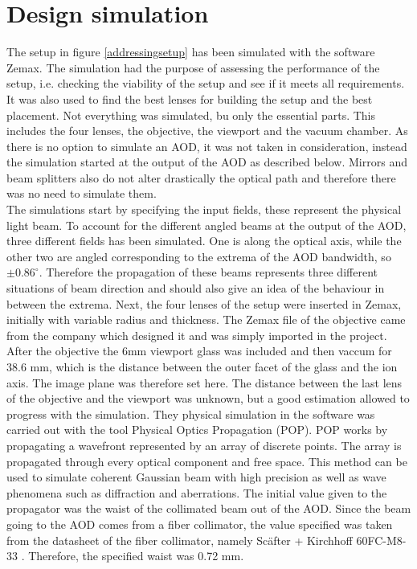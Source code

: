 \section{Design simulation}
The setup in figure \ref{addressingsetup} has been simulated with the software Zemax. The simulation had the purpose of assessing the performance of the setup, i.e. checking the viability of the setup and see if it meets all requirements. It was also used to find the best lenses for building the setup and the best placement. Not everything was simulated, bu only the essential parts. This includes the four lenses, the objective, the viewport and the vacuum chamber. As there is no option to simulate an AOD, it was not taken in consideration, instead the simulation started at the output of the AOD as described below. Mirrors and beam splitters also do not alter drastically the optical path and therefore there was no need to simulate them.\\
The simulations start by specifying the input fields, these represent the physical light beam. To account for the different angled beams at the output of the AOD, three different fields has been simulated. One is along the optical axis, while the other two are angled corresponding to the extrema of the AOD bandwidth, so $\pm0.86^{\circ}$. Therefore the propagation of these beams represents three different situations of beam direction and should also give an idea of the behaviour in between the extrema. Next, the four lenses of the setup were inserted in Zemax, initially with variable radius and thickness. The Zemax file of the objective came from the company which designed it and was simply imported in the project. After the objective the 6mm viewport glass was included and then vaccum for 38.6 mm, which is the distance between the outer facet of the glass and the ion axis. The image plane was therefore set here. The distance between the last lens of the objective and the viewport was unknown, but a good estimation allowed to progress with the simulation.
They physical simulation in the software was carried out with the tool Physical Optics Propagation (POP). POP works by propagating a wavefront represented by an array of discrete points. The array is propagated through every optical component and free space. This method can be used to simulate coherent Gaussian beam with high precision as well as wave phenomena such as diffraction and aberrations. The initial value given to the propagator was the waist of the collimated beam out of the AOD. Since the beam going to the AOD comes from a fiber collimator, the value specified was taken from the datasheet of the fiber collimator, namely Sc\"after + Kirchhoff 60FC-M8-33 \cite{fibercollimator}. Therefore, the specified waist was 0.72 mm.\\
